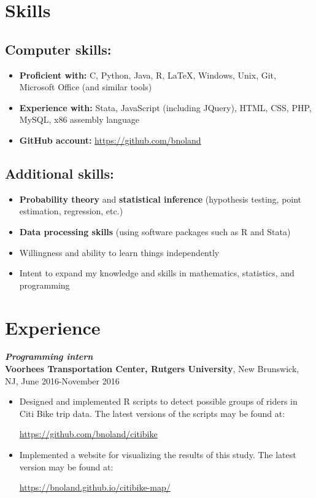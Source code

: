 \documentclass[12pt]{article}
\begin{document}
\section*{Skills}

\subsection*{Computer skills:}
\begin{itemize}
\item
\textbf{Proficient with:} C, Python, Java, R, \LaTeX, Windows, Unix, Git, Microsoft Office (and similar tools)
\item
\textbf{Experience with:} Stata, JavaScript (including JQuery), HTML, CSS, PHP, MySQL, x86 assembly language
\item
\textbf{GitHub account:} \url{https://github.com/bnoland}
\end{itemize}

\subsection*{Additional skills:}

\begin{itemize}
\item
\textbf{Probability theory} and \textbf{statistical inference} (hypothesis testing, point estimation, regression, etc.)
\item
\textbf{Data processing skills} (using software packages such as R and Stata)
\item
Willingness and ability to learn things independently
\item
Intent to expand my knowledge and skills in mathematics, statistics, and programming
\end{itemize}

\section*{Experience}

\textit{\textbf{Programming intern}} \\
\textbf{Voorhees Transportation Center, Rutgers University}, New Brunswick, NJ, June 2016-November 2016
\begin{itemize}
\item
Designed and implemented R scripts to detect possible groups of riders in Citi Bike trip data. The latest versions of the scripts may be found at:
\begin{center}
\url{https://github.com/bnoland/citibike}
\end{center}

\item
Implemented a website for visualizing the results of this study. The latest version may be found at:
\begin{center}
\url{https://bnoland.github.io/citibike-map/}
\end{center}

\end{itemize}
\end{document}
